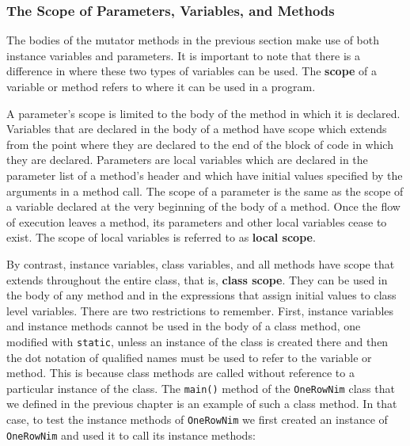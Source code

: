 \subsubsection*{The Scope of Parameters, Variables, and Methods}

\noindent The bodies of the mutator methods in the previous
section make use of both instance variables and parameters.  It is
important to note that there is a difference in where these two types
of variables can be used. The {\bf scope} of a variable
or method refers to where it can be used in a program.

A parameter's scope is limited to the body of
the method in which it is declared. Variables that are declared in the
body of a method have scope which extends from the point where they
are declared to the end of the block of code in which they are
declared. Parameters are local variables which are declared in the
parameter list of a method's header and which have initial values
specified by the arguments in a method call. The scope of a parameter
is the same as the scope of a variable declared at the very beginning
of the body of a method.
Once the flow of execution leaves a method, its parameters and other
local variables cease to exist. The scope of local variables is
referred to as {\bf local scope}.


By contrast, instance variables, class variables, and all methods have
scope that extends throughout the entire class, that is, {\bf class
scope}.  They can be used in the body of any method and in the
expressions that assign initial values to class level variables.
There are two restrictions to remember.  First, instance variables and
instance methods cannot be used in the body of a class method, one
modified with {\tt static}, unless an instance of the class is created
there and then the dot notation of qualified names must be used to
refer to the variable or method.  This is because class methods are
called without reference to a particular instance of the class.  The
{\tt main()} method of the {\tt OneRowNim} class that we defined in
the previous chapter is an example of such a class method.  In that
case, to test the instance methods of {\tt OneRowNim} we first created an 
instance of {\tt OneRowNim} and used it to call its instance methods:

